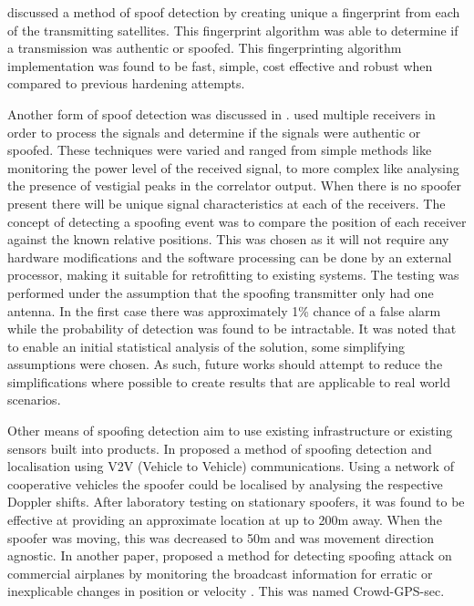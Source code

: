 \textcite{RN7} discussed a method of spoof detection by creating unique a fingerprint from each of the transmitting satellites. This fingerprint algorithm was able to determine if a transmission was
authentic or spoofed. This fingerprinting algorithm implementation was found to be fast, simple, cost effective and robust when compared to previous hardening attempts.

Another form of spoof detection was discussed in \cite{RN10}. \textcite{RN10} used multiple receivers in order to process the signals and determine if the signals were
authentic or spoofed. These techniques were varied and ranged from simple methods like monitoring the power level
of the received signal, to more complex like analysing the presence of vestigial peaks in the correlator output. When there is no spoofer present there will be unique signal
characteristics at each of the receivers. The concept of detecting a spoofing event was to compare the position of each receiver against the known relative positions. This
was chosen as it will not require any hardware modifications and the software processing can be done by an external processor, making it suitable for retrofitting to
existing systems. The testing was performed under the assumption that the spoofing transmitter only had one antenna. In the
first case there was approximately 1\% chance of a false alarm while the probability of detection was found to be intractable.
It was noted that to enable an initial statistical analysis of the solution, some simplifying assumptions were chosen. As such, future works should attempt to reduce the
simplifications where possible to create results that are applicable to real world scenarios.

Other means of spoofing detection aim to use existing infrastructure or existing sensors built into products. In \cite{RN1} \citeauthor{RN1} proposed a method of spoofing
detection and localisation using V2V (Vehicle to Vehicle) communications. Using a network of cooperative vehicles the spoofer could be localised by analysing the respective
Doppler shifts. After laboratory testing on stationary spoofers, it was found to be effective at providing an approximate location at up to 200m away.
When the spoofer was moving, this was decreased to 50m and was movement direction agnostic. In another paper, \citeauthor{RN24} proposed a method for detecting spoofing
attack on commercial airplanes by monitoring the broadcast information for erratic or inexplicable changes in position or velocity \cite{RN24}. This was named
Crowd-GPS-sec.

